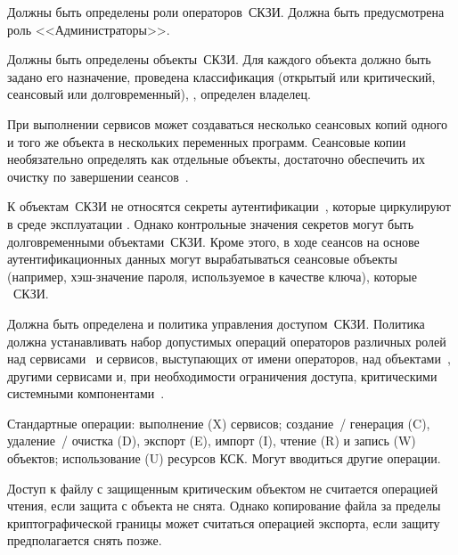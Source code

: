 \label{R.AC.Roles}
Должны быть определены роли операторов~СКЗИ. 
Должна быть предусмотрена роль <<Администраторы>>.

\label{R.AC.Objects}
Должны быть определены объекты~СКЗИ.
Для каждого объекта должно быть задано его назначение,
проведена классификация (открытый или критический, сеансовый или 
долговременный), 
,
определен владелец.

\begin{note}
При выполнении сервисов может создаваться несколько сеансовых копий одного 
и того же объекта в нескольких переменных программ.
%
Сеансовые копии необязательно определять как отдельные объекты,
достаточно обеспечить их очистку по завершении сеансов~.
\end{note}

\begin{note}
К объектам~СКЗИ не относятся секреты аутентификации~,
которые циркулируют в среде эксплуатации .
%
Однако контрольные значения секретов могут быть долговременными объектами~СКЗИ.
Кроме этого, в ходе сеансов на основе аутентификационных данных могут
вырабатываться сеансовые объекты (например, хэш-значение пароля, используемое в
качестве ключа), которые ~СКЗИ.
\end{note}

\label{R.AC.Policy}
Должна быть определена и  
политика управления доступом~СКЗИ.
Политика должна устанавливать набор допустимых 
операций операторов различных ролей~ 
над сервисами~ и сервисов, 
выступающих от имени операторов, над объектами~,
другими сервисами и, при необходимости ограничения доступа, 
критическими системными компонентами~.

\begin{note}
Стандартные операции: 
выполнение (X) сервисов; 
создание~/ генерация (C), удаление~/ очистка (D), экспорт (E), импорт (I), 
чтение (R) и запись (W) объектов; 
использование (U) ресурсов КСК.
%
Могут вводиться другие операции.
\end{note}

\begin{note}
Доступ к файлу с защищенным критическим объектом не считается операцией 
чтения, если защита с объекта не снята. Однако копирование файла за пределы 
криптографической границы может считаться операцией экспорта, если защиту 
предполагается снять позже.
\end{note}

